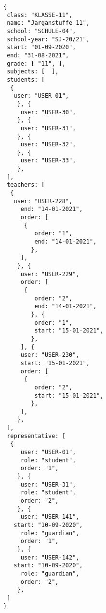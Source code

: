 
\begin{lstlisting}[caption={Klassen Datenmodel Beispiel 2: Jagangstuffe 11, Seundarstuffe 2},frame=tlrb]
{
 class: "KLASSE-11",
 name: "Jarganstuffe 11",
 school: "SCHULE-04",
 school-year: "SJ-20/21",
 start: "01-09-2020",
 end: "31-08-2021",
 grade: [ "11", ],
 subjects: [  ],
 students: [
  { 
   user: "USER-01",
	}, { 
	 user: "USER-30",
	}, { 
	 user: "USER-31",
	}, { 
	 user: "USER-32",
	}, { 
	 user: "USER-33",
	},
 ],
 teachers: [
  { 
   user: "USER-228",
	 end: "14-01-2021",
	 order: [
	  {
		 order: "1",
		 end: "14-01-2021",
		},
	 ],
	}, { 
	 user: "USER-229",
	 order: [
	  {
		 order: "2",
		 end: "14-01-2021",
		}, {
		 order: "1",
		 start: "15-01-2021",
		},
	 ], { 
	 user: "USER-230",
	 start: "15-01-2021",
	 order: [
	  {
		 order: "2",
		 start: "15-01-2021",
		},
	 ],
	},
 ],
 representative: [
  {
	 user: "USER-01",
	 role: "student",
	 order: "1",	 
	}, {
	 user: "USER-31",
	 role: "student",
	 order: "2",	 
	}, {
	 user: "USER-141",
   start: "10-09-2020",
	 role: "guardian",
	 order: "1",	 
	}, {
	 user: "USER-142",
   start: "10-09-2020",
	 role: "guardian",
	 order: "2",	 
	},  
 ]
}
\end{lstlisting}